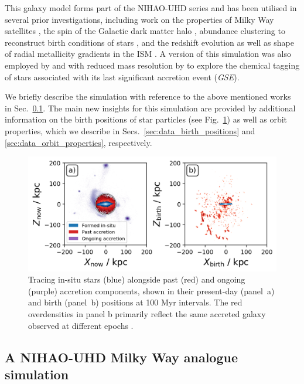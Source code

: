 \documentclass[fleqn,usenatbib]{mnras}
\begin{document}
This galaxy model forms part of the NIHAO-UHD series \citep{Buck2020b} and has been utilised in several prior investigations, including work on the properties of Milky Way satellites \citep{Buck2019b}, the spin of the Galactic dark matter halo \citep{Obreja2022}, abundance clustering to reconstruct birth conditions of stars \citep{Ratcliffe2022}, and the redshift evolution as well as shape of radial metallicity gradients in the ISM \citep{Ratcliffe2025, Buder2025}. A version of this simulation was also employed by \citet{Buck2023} and with reduced mass resolution by \citet{Buder2024} to explore the chemical tagging of stars associated with its last significant accretion event (\textit{GSE}).

We briefly describe the simulation with reference to the above mentioned works in Sec.~\ref{sec:data_simulation}. The main new insights for this simulation are provided by additional information on the birth positions of star particles (see Fig.~\ref{fig:tracing_insitu_accretion_2}) as well as orbit properties, which we describe in Secs.~\ref{sec:data_birth_positions} and \ref{sec:data_orbit_properties}, respectively.

\begin{figure}
    \centering
    \includegraphics[width=\columnwidth]{figures/tracing_insitu_accretion_2.png}
    \caption{Tracing in-situ stars (blue) alongside past (red) and ongoing (purple) accretion components, shown in their present-day (panel~a) and birth (panel~b) positions at 100 Myr intervals. The red overdensities in panel b primarily reflect the same accreted galaxy observed at different epochs \href{https://github.com/svenbuder/gse_nihaouhd/tree/main/figures}{\faGithub}.}
    \label{fig:tracing_insitu_accretion_2}
\end{figure}

\subsection{A NIHAO-UHD Milky Way analogue simulation} \label{sec:data_simulation}
\end{document}
